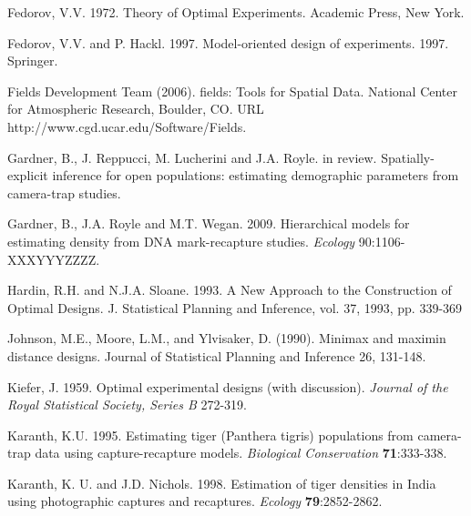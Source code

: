 \documentclass[useAMS,referee]{biom}
\begin{document}
\rf  Fedorov, V.V. 1972. Theory of Optimal Experiments. Academic
Press, New York.

\rf Fedorov, V.V. and P. Hackl. 1997. Model-oriented design of
experiments. 1997. Springer.

\rf Fields Development Team (2006). fields: Tools for Spatial Data. National Center for Atmospheric Research, Boulder, CO. URL http://www.cgd.ucar.edu/Software/Fields. 

\rf  Gardner, B., J. Reppucci, M. Lucherini and J.A. Royle. in review.
Spatially-explicit  inference  for open  populations:  estimating  demographic
parameters from camera-trap studies. 

\rf Gardner, B., J.A. Royle and M.T. Wegan.  2009. 
Hierarchical models for
estimating density from DNA mark-recapture studies. {\it Ecology} 90:1106-XXXYYYZZZZ.

\rf Hardin, R.H. and N.J.A. Sloane. 1993. A New Approach to the Construction
of Optimal Designs. J. Statistical Planning and Inference, vol. 37,
1993, pp. 339-369 


\rf Johnson, M.E., Moore, L.M., and Ylvisaker, D. (1990). Minimax and 
maximin distance designs. Journal of Statistical Planning and
Inference 
26, 131-148. 

\rf Kiefer, J. 1959. Optimal experimental designs (with
discussion). {\it Journal of the Royal Statistical Society, Series B}
272-319.



\rf Karanth, K.U. 1995. Estimating tiger (Panthera tigris)
populations from camera-trap data using capture-recapture models. {\it
  Biological Conservation} {\bf 71}:333-338.
 
 
\rf Karanth, K. U. and J.D. Nichols. 1998. Estimation of tiger densities
 in India using photographic captures and recaptures. 
 {\it Ecology} {\bf 79}:2852-2862.
 
\end{document}
